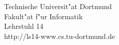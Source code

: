 \begin{titlepage}
\vspace*{2.5cm}
\hspace*{\links}
\begin{minipage}[b]{8cm}
\raggedright
Technische Universit"at Dortmund \\
Fakult"at f"ur Informatik\\
Lehrstuhl 14\\
http://ls14-www.cs.tu-dortmund.de
\end{minipage}
\begin{minipage}[b]{8cm}
\raggedleft

\end{minipage}

\end{titlepage}

